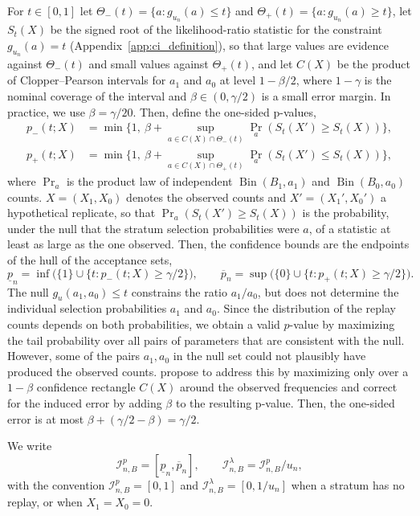 \documentclass[10pt]{article}
\begin{document}
For $t\in[0,1]$ let $\Theta_-(t)=\{a:g_{u_n}(a)\le t\}$ and $\Theta_+(t)=\{a:g_{u_n}(a)\ge t\}$, let $S_t(X)$ be the signed root of the likelihood-ratio statistic for the constraint $g_{u_n}(a)=t$ (Appendix~\ref{app:ci_definition}), so that large values are evidence against $\Theta_-(t)$ and small values against $\Theta_+(t)$, and let $C(X)$ be the product of Clopper--Pearson intervals for $a_1$ and $a_0$ at level $1-\beta/2$, where $1-\gamma$ is the nominal coverage of the interval and $\beta \in (0,\gamma/2)$ is a small error margin. In practice, we use $\beta=\gamma/20$. Then, define the one-sided p-values,
\begin{align*}
p_-(t;X) & =\min\Big\{1,\ \beta+\sup_{a\in C(X)\cap\Theta_-(t)}\Pr_a(S_t(X')\ge S_t(X))\Big\},
\\
p_+(t;X)& =\min\Big\{1,\ \beta+\sup_{a\in C(X)\cap\Theta_+(t)}\Pr_a(S_t(X')\le S_t(X))\Big\},
\end{align*}
where $\Pr_a$ is the product law of independent $\operatorname{Bin}(B_1,a_1)$ and $\operatorname{Bin}(B_0,a_0)$ counts. $X=(X_1,X_0)$ denotes the observed counts and $X'=(X_1',X_0')$ a hypothetical replicate, so that $\Pr_a(S_t(X')\ge S_t(X))$ is the probability, under the null that the stratum selection probabilities were $a$, of a statistic at least as large as the one observed. Then, the confidence bounds are the endpoints of the hull of the acceptance sets,
\begin{equation}\label{eq:ci_bounds}
\underline p_n=\inf\bigl(\{1\}\cup\{t:p_-(t;X)\ge\gamma/2\}\bigr),
\qquad
\overline p_n=\sup\bigl(\{0\}\cup\{t:p_+(t;X)\ge\gamma/2\}\bigr).
\end{equation}
The null $g_u\left(a_1, a_0\right) \leq t$ constrains the ratio $a_1 / a_0$, but does not determine the individual selection probabilities $a_1$ and $a_0$. Since the distribution of the replay counts depends on both probabilities, we obtain a valid $p$-value by maximizing the tail probability over all pairs of parameters that are consistent with the null. However, some of the pairs $a_1, a_0$ in the null set could not plausibly have produced the observed counts.  \citet{berger1994p} propose to address this by maximizing only over a $1-\beta$ confidence rectangle $C(X)$ around the observed frequencies and correct for the induced error by adding $\beta$ to the resulting p-value. Then, the one-sided error is at most $\beta+(\gamma/2-\beta)=\gamma/2$.

 We write
\[
\mathcal I^p_{n,B}=[\underline p_n,\overline p_n],
\qquad
\mathcal I^\lambda_{n,B}=\mathcal I^p_{n,B}/u_n,
\]
with the convention $\mathcal I^p_{n,B}=[0,1]$ and $\mathcal I^\lambda_{n,B}=[0,1/u_n]$ when a stratum has no replay, or when $X_1=X_0=0$.
\end{document}
